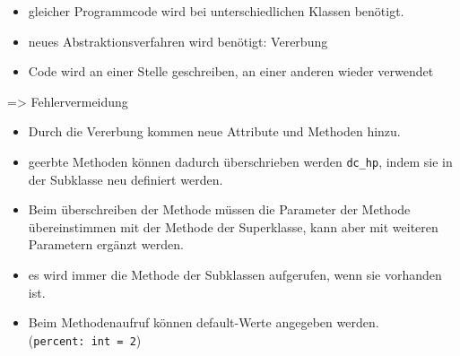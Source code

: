 \documentclass[
  11pt,
  a4paper,
  DIV=11,
  numbers=noendperiod]{scrartcl}
\providecommand{\tightlist}{%
  \setlength{\itemsep}{0pt}\setlength{\parskip}{0pt}}\usepackage{longtable,booktabs,array}
\begin{document}
\begin{tcolorbox}[enhanced jigsaw, coltitle=black, left=2mm, colbacktitle=quarto-callout-warning-color!10!white, colframe=quarto-callout-warning-color-frame, toptitle=1mm, opacitybacktitle=0.6, title=\textcolor{quarto-callout-warning-color}{\faExclamationTriangle}\hspace{0.5em}{Beobachtung}, bottomrule=.15mm, colback=white, bottomtitle=1mm, breakable, toprule=.15mm, arc=.35mm, titlerule=0mm, leftrule=.75mm, rightrule=.15mm, opacityback=0]

\begin{itemize}
\tightlist
\item
  gleicher Programmcode wird bei unterschiedlichen Klassen benötigt.
\item
  neues Abstraktionsverfahren wird benötigt: Vererbung
\item
  Code wird an einer Stelle geschreiben, an einer anderen wieder
  verwendet
\end{itemize}

=\textgreater{} Fehlervermeidung

\end{tcolorbox}

\begin{itemize}
\tightlist
\item
  Durch die Vererbung kommen neue Attribute und Methoden hinzu.
\item
  geerbte Methoden können dadurch überschrieben werden \texttt{dc\_hp},
  indem sie in der Subklasse neu definiert werden.
\item
  Beim überschreiben der Methode müssen die Parameter der Methode
  übereinstimmen mit der Methode der Superklasse, kann aber mit weiteren
  Parametern ergänzt werden.
\item
  es wird immer die Methode der Subklassen aufgerufen, wenn sie
  vorhanden ist.
\item
  Beim Methodenaufruf können default-Werte angegeben werden.
  (\texttt{percent:\ int\ =\ 2})
\end{itemize}
\end{document}
